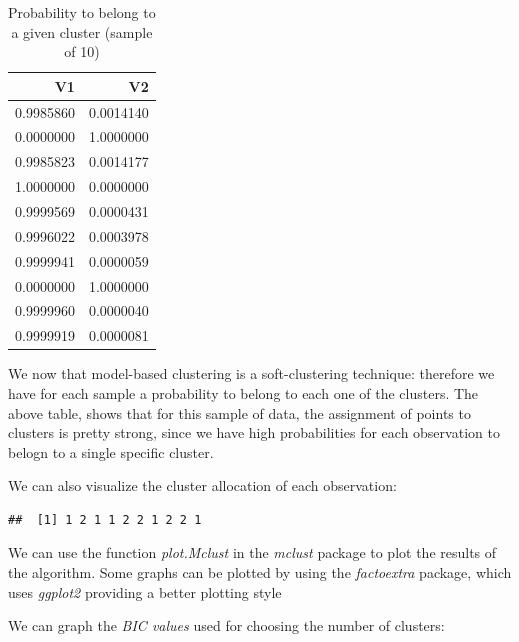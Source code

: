 \documentclass[
]{article}
\newenvironment{Shaded}{\begin{snugshade}}{\end{snugshade}}
\newcommand{\CommentTok}[1]{\textcolor[rgb]{0.56,0.35,0.01}{\textit{#1}}}
\newcommand{\DecValTok}[1]{\textcolor[rgb]{0.00,0.00,0.81}{#1}}
\newcommand{\FunctionTok}[1]{\textcolor[rgb]{0.00,0.00,0.00}{#1}}
\newcommand{\NormalTok}[1]{#1}
\newcommand{\SpecialCharTok}[1]{\textcolor[rgb]{0.00,0.00,0.00}{#1}}
\begin{document}
\begin{table}

\caption{\label{tab:unnamed-chunk-76}Probability to belong to a given cluster (sample of 10)}
\centering
\begin{tabular}[t]{r|r}
\hline
V1 & V2\\
\hline
0.9985860 & 0.0014140\\
\hline
0.0000000 & 1.0000000\\
\hline
0.9985823 & 0.0014177\\
\hline
1.0000000 & 0.0000000\\
\hline
0.9999569 & 0.0000431\\
\hline
0.9996022 & 0.0003978\\
\hline
0.9999941 & 0.0000059\\
\hline
0.0000000 & 1.0000000\\
\hline
0.9999960 & 0.0000040\\
\hline
0.9999919 & 0.0000081\\
\hline
\end{tabular}
\end{table}

We now that model-based clustering is a soft-clustering technique:
therefore we have for each sample a probability to belong to each one of
the clusters. The above table, shows that for this sample of data, the
assignment of points to clusters is pretty strong, since we have high
probabilities for each observation to belogn to a single specific
cluster.

We can also visualize the cluster allocation of each observation:

\begin{Shaded}
\end{Shaded}

\begin{verbatim}
##  [1] 1 2 1 1 2 2 1 2 2 1
\end{verbatim}

We can use the function \emph{plot.Mclust} in the \emph{mclust} package
to plot the results of the algorithm. Some graphs can be plotted by
using the \emph{factoextra} package, which uses \emph{ggplot2} providing
a better plotting style

We can graph the \emph{BIC values} used for choosing the number of
clusters:
\end{document}
